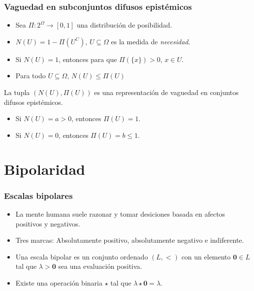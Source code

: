 \documentclass{beamer}
\theoremstyle{definition}
\begin{document}
\begin{frame}
  \frametitle{Vaguedad en subconjuntos difusos epistémicos}
  \begin{itemize}
  \item Sea $\Pi: 2^\Omega \to [0,1]$ una distribución de posibilidad.
  \item $N(U) = 1 - \Pi(U^C)$, $U \subseteq \Omega$ es la medida de
    \emph{necesidad}.
  \item Si $N(U) = 1$, entonces para que $\Pi(\{x\}) > 0$, $x \in U$.
  \item Para todo $U \subseteq \Omega$, $N(U) \leq \Pi(U)$
  \end{itemize}

  \begin{center}
    \alert{La tupla $(N(U), \Pi(U))$ es una representación de vaguedad
      en conjuntos difusos epistémicos.}
  \end{center}
\begin{itemize}
\item Si $N(U) = a > 0$, entonces $\Pi(U) = 1$.
\item Si $N(U) = 0$, entonces $\Pi(U) = b \leq 1$.
\end{itemize}

\end{frame}

\section{Bipolaridad}

\begin{frame}
  \frametitle{Escalas bipolares}
  \begin{itemize}
  \item La mente humana suele razonar y tomar desiciones basada en
    afectos positivos y negativos.
  \item Tres marcas: Absolutamente positivo, absolutamente negativo e
    indiferente.
  \item Una escala bipolar es un conjunto ordenado $(L, <)$ con un
    elemento $\mathbf{0} \in L$ tal que $\lambda > \mathbf{0}$ sea una
    evaluación positiva.
  \item Existe una operación binaria $\star$ tal que $\lambda \star
    \mathbf{0} = \lambda$. 
  \end{itemize}
\end{frame}
\end{document}
